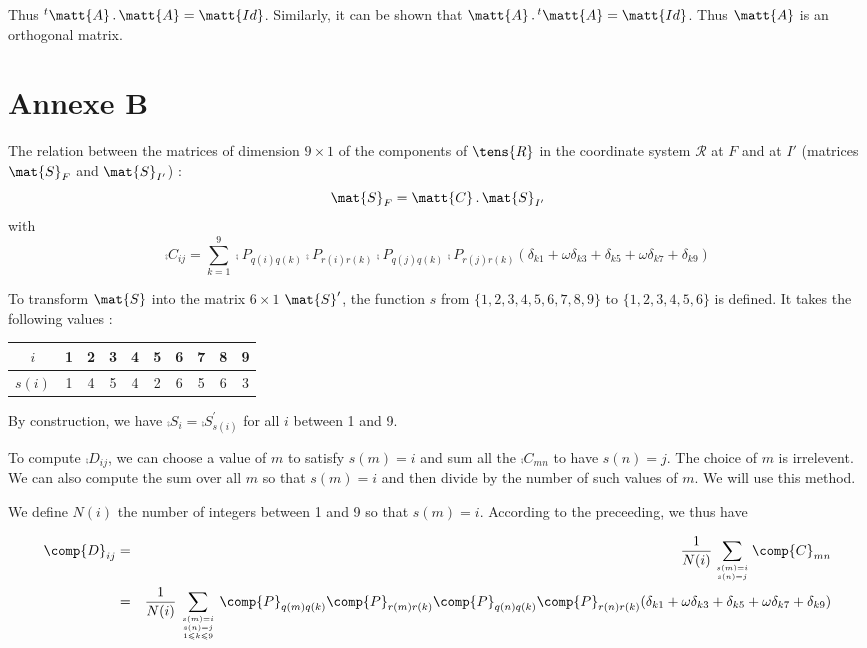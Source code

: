 Thus $^t\matt{A}\,.\,\matt{A}=\matt{Id}$. Similarly, it can be shown that
$\matt{A}\,.\,^t\matt{A}=\matt{Id}$. Thus $\matt{A}$ is an orthogonal matrix.


\section*{Annexe B}

The relation between the matrices of dimension $9\times1$
of the components of $\tens{R}$ in the coordinate system $\mathcal{R}$ at $F$ and at $I'$
(matrices $\mat{S}_F$ and $\mat{S}_{I'}$) :
\begin{equation}
\mat{S}_F=\matt{C}\,.\,\mat{S}_{I'}
\end{equation}
with
\begin{equation}
\comp{C}_{ij}=\sum_{k=1}^9
\comp{P}_{q(i)q(k)}\comp{P}_{r(i)r(k)}\comp{P}_{q(j)q(k)}\comp{P}_{r(j)r(k)}
(\delta_{k1}+\omega\delta_{k3}+\delta_{k5}+\omega\delta_{k7}+\delta_{k9})
\end{equation}

To transform $\mat{S}$ into the matrix $6\times 1$ $\mat{S}^\prime$,
the function $s$ from $\{1,2,3,4,5,6,7,8,9\}$ to
$\{1,2,3,4,5,6\}$ is defined. It takes the following values :
\begin{center}
\begin{tabular}{|c|c|c|c|c|c|c|c|c|c|}
\hline
$i$&1&2&3&4&5&6&7&8&9\\
\hline
$s(i)$&1&4&5&4&2&6&5&6&3\\
\hline
\end{tabular}
\end{center}
By construction, we have $\comp{S}_i=\comp{S}^\prime_{s(i)}$ for all $i$ between 1
and 9.

To compute $\comp{D}_{ij}$, we can choose a value of $m$ to satisfy
$s(m)=i$ and sum all the $\comp{C}_{mn}$ to have $s(n)=j$. The choice of $m$
is irrelevent. We can also compute the sum over all $m$ so that  $s(m)=i$ and then
divide by the number of such values of $m$. We will use this method.

We define $N(i)$ the number of integers between 1 and 9 so that $s(m)=i$.
According to the preceeding, we thus have

\begin{eqnarray}
\comp{D}_{ij}&=&\frac{1}{N(i)}\sum_{s(m)=i \atop s(n)=j}\comp{C}_{mn}\nonumber\\
&=&\frac{1}{N(i)}\sum_{{s(m)=i \atop s(n)=j}\atop 1\leqslant k\leqslant 9}
\comp{P}_{q(m)q(k)}\comp{P}_{r(m)r(k)}\comp{P}_{q(n)q(k)}\comp{P}_{r(n)r(k)}
(\delta_{k1}+\omega\delta_{k3}+\delta_{k5}+\omega\delta_{k7}+\delta_{k9})
\end{eqnarray}

